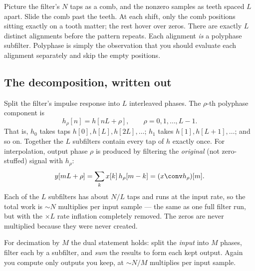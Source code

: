 \begin{intuitionbox}
Picture the filter's $N$ taps as a comb, and the nonzero samples as teeth spaced
$L$ apart. Slide the comb past the teeth. At each shift, only the comb positions
sitting exactly on a tooth matter; the rest hover over zeros. There are exactly
$L$ distinct alignments before the pattern repeats. Each alignment \emph{is} a
polyphase subfilter. Polyphase is simply the observation that you should evaluate
each alignment separately and skip the empty positions.
\end{intuitionbox}

\subsection{The decomposition, written out}

Split the filter's impulse response into $L$ interleaved phases. The $\rho$-th
polyphase component is
\begin{equation}
  h_\rho[n] = h[nL + \rho], \qquad \rho = 0, 1, \dots, L-1.
  \label{ch22:polydef}
\end{equation}
That is, $h_0$ takes taps $h[0], h[L], h[2L], \dots$; $h_1$ takes
$h[1], h[L+1], \dots$; and so on. Together the $L$ subfilters contain every tap
of $h$ exactly once. For interpolation, output phase $\rho$ is produced by
filtering the \emph{original} (not zero-stuffed) signal with $h_\rho$:
\begin{equation}
  y[mL + \rho] = \sum_k x[k]\,h_\rho[m-k] = (x \conv h_\rho)[m].
  \label{ch22:polyinterp}
\end{equation}
Each of the $L$ subfilters has about $N/L$ taps and runs at the input rate, so
the total work is $\sim N$ multiplies per input sample --- the same as one full
filter run, but with the $\times L$ rate inflation completely removed. The zeros
are never multiplied because they were never created.

For decimation by $M$ the dual statement holds: split the \emph{input} into $M$
phases, filter each by a subfilter, and \emph{sum} the results to form each kept
output. Again you compute only outputs you keep, at $\sim N/M$ multiplies per
input sample.

